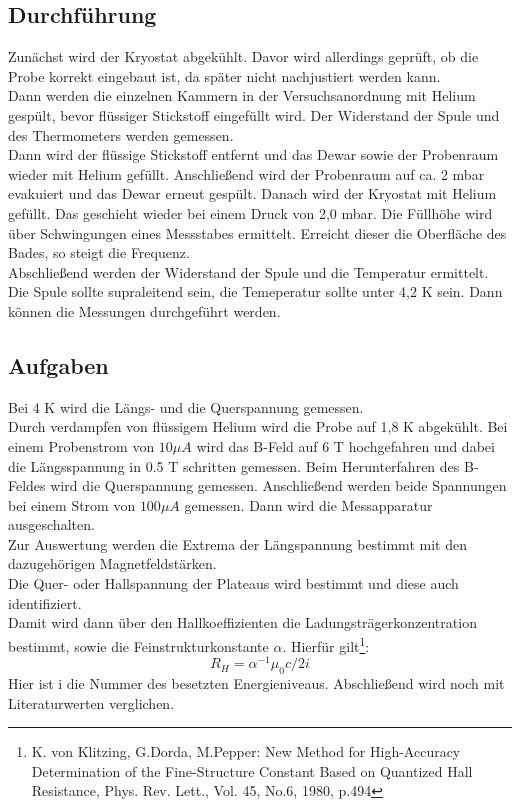 \subsection{Durchführung}
Zunächst wird der Kryostat abgekühlt. Davor wird allerdings geprüft, ob die Probe korrekt eingebaut ist, da später nicht nachjustiert werden kann. \\
Dann werden die einzelnen Kammern in der Versuchsanordnung mit Helium gespült, bevor flüssiger Stickstoff eingefüllt wird. Der Widerstand der Spule und des Thermometers werden gemessen. \\
Dann wird der flüssige Stickstoff entfernt und das Dewar sowie der Probenraum wieder mit Helium gefüllt. Anschließend wird der Probenraum auf ca. 2 mbar evakuiert und das Dewar erneut gespült. Danach wird der Kryostat mit Helium gefüllt. Das geschieht wieder bei einem Druck von 2,0 mbar. Die Füllhöhe wird über Schwingungen eines Messstabes ermittelt. Erreicht dieser die Oberfläche des Bades, so steigt die Frequenz. \\
Abschließend werden der Widerstand der Spule und die Temperatur ermittelt. Die Spule sollte supraleitend sein, die Temeperatur sollte unter 4,2 K sein. Dann können die Messungen durchgeführt werden.
\subsection{Aufgaben}
Bei 4 K wird die Längs- und die Querspannung gemessen. \\
Durch verdampfen von flüssigem Helium wird die Probe auf 1,8 K abgekühlt. Bei einem Probenstrom von $10 \mu A$ wird das B-Feld auf 6 T hochgefahren und dabei die Längsspannung in 0.5 T schritten gemessen. Beim Herunterfahren des B-Feldes wird die Querspannung gemessen. Anschließend werden beide Spannungen bei einem Strom von $100 \mu A$ gemessen. Dann wird die Messapparatur ausgeschalten. \\

Zur Auswertung werden die Extrema der Längspannung bestimmt mit den dazugehörigen Magnetfeldstärken. \\
Die Quer- oder Hallspannung der Plateaus wird bestimmt und diese auch identifiziert. \\
Damit wird dann über den Hallkoeffizienten die Ladungsträgerkonzentration bestimmt, sowie die Feinstrukturkonstante $\alpha$. Hierfür gilt\footnote{K. von Klitzing, G.Dorda, M.Pepper: New Method for High-Accuracy Determination of the Fine-Structure Constant Based on Quantized Hall Resistance, Phys. Rev. Lett., Vol. 45, No.6, 1980, p.494}: 
$$R_H = \alpha ^{-1} \mu _0 c /2i $$
Hier ist i die Nummer des besetzten Energieniveaus. Abschließend wird noch mit Literaturwerten verglichen.